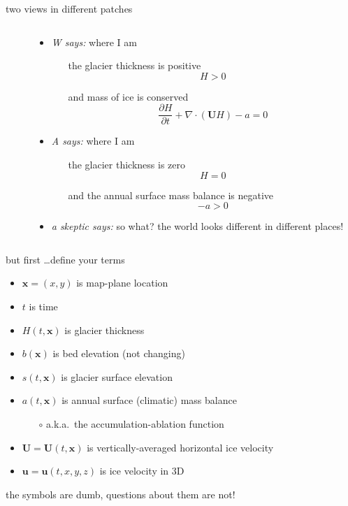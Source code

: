 \documentclass[10pt,hyperref,dvipsnames]{beamer}
\newcommand{\bx}{\mathbf{x}}
\newcommand{\bu}{\mathbf{u}}
\newcommand{\bU}{\mathbf{U}}
\newcommand{\Div}{\nabla\cdot}
\begin{document}
\begin{frame}{two views in different patches}
\begin{columns}
\begin{column}{0.25\textwidth}
\bigskip

\bigskip
\end{column}
\begin{column}{0.75\textwidth}
\begin{itemize}
\item \emph{W says:} where I am
    \begin{itemize}
    \item[] the glacier thickness is positive
        $$H>0$$
    \item[] and mass of ice is conserved
        $$\frac{\partial H}{\partial t} + \Div \left(\bU H\right) - a = 0$$
    \end{itemize}
\item \emph{A says:} where I am
    \begin{itemize}
    \item[] the glacier thickness is zero
        $$H=0$$
    \item[] and the annual surface mass balance is negative
        $$-a > 0$$
    \end{itemize}

\medskip
\item<2> \emph{a skeptic says:} so what?  the world looks different in different places!
\end{itemize}
\end{column}
\end{columns}
\end{frame}


\begin{frame}{but first \dots define your terms}
\begin{itemize}
\item $\bx = (x,y)$ is map-plane location
\item $t$ is time

\medskip
\item $H(t,\bx)$ is glacier thickness
\item $b(\bx)$ is bed elevation (not changing)
\item $s(t,\bx)$ is glacier surface elevation
\item $a(t,\bx)$ is annual surface (climatic) mass balance
    \begin{itemize}
    \item[$\circ$] a.k.a.~the accumulation-ablation function
    \end{itemize}
\item $\bU = \bU(t,\bx)$ is vertically-averaged horizontal ice velocity
\item $\bu = \bu(t,x,y,z)$ is ice velocity in 3D
\end{itemize}

\vspace{20mm}

\footnotesize
\alert{the symbols are dumb, questions about them are not!}
\end{frame}
\end{document}
